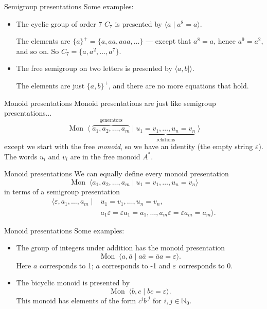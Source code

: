 \documentclass{beamer}
\let\epsilon\varepsilon
\newcommand{\Mon}{\operatorname{Mon}\;}
\begin{document}
\begin{frame}{Semigroup presentations}
	Some examples:
	\pause
	\begin{itemize}
		\item
			The cyclic group of order 7 $C_7$ is presented by $\langle a \mid a^8 = a\rangle$.\medskip

			The elements are $\{a\}^+ = \{a, aa, aaa, \ldots\}$ --- except that $a^8 = a$, hence $a^9 = a^2$, and so on. So $C_7 = \{a, a^2, \ldots, a^7\}$.\bigskip
		
		\pause
		\item
			The free semigroup on two letters is presented by $\langle a, b \mid \rangle$.\medskip

			The elements are just $\{a, b\}^+$, and there are no more equations that hold.
	\end{itemize}
\end{frame}

\begin{frame}{Monoid presentations}
	Monoid presentations are just like semigroup presentations...
	\[
		\Mon \langle \; \overbrace{a_1, a_2, \ldots, a_m}^{\text{generators}}
			\mid 
			\underbrace{u_1 = v_1, \ldots, u_n = v_n}_{\text{relations}} \;
			\rangle
	\]
	except we start with the free \emph{monoid}, so we have an identity (the empty string $\epsilon$). The words $u_i$ and $v_i$ are in the free monoid $A^*$.
\end{frame}

\begin{frame}{Monoid presentations}
	We can equally define every monoid presentation
	\[
		\Mon \langle a_1, a_2, \ldots, a_m
			\mid 
			u_1 = v_1, \ldots, u_n = v_n
			\rangle
	\]
	in terms of a semigroup presentation
	\begin{align*}
		\langle \epsilon, a_1, \ldots, a_m
		\mid&
		u_1 = v_1, \ldots, u_n = v_n, \\
		& a_1\epsilon = \epsilon a_1 = a_1,
		\ldots,
		a_m\epsilon = \epsilon a_m = a_m
		\rangle.
	\end{align*}
\end{frame}

\begin{frame}{Monoid presentations}
	Some examples:
	\pause
	\begin{itemize}
		\item
			The group of integers under addition has the monoid presentation
				\[ \Mon \langle a, \bar a \mid a\bar a = \bar a a = \epsilon \rangle. \]
			Here $a$ corresponds to 1; $\bar a$ corresponds to -1 and $\epsilon$ corresponds to $0$.
		\bigskip
		\pause
		\item
			The bicyclic monoid is presented by \[ \Mon \langle b, c \mid bc = \epsilon \rangle. \]
			This monoid has elements of the form $c^i {b\,}^j$ for $i, j \in \mathbb{N}_0$.
	\end{itemize}
\end{frame}
\end{document}
